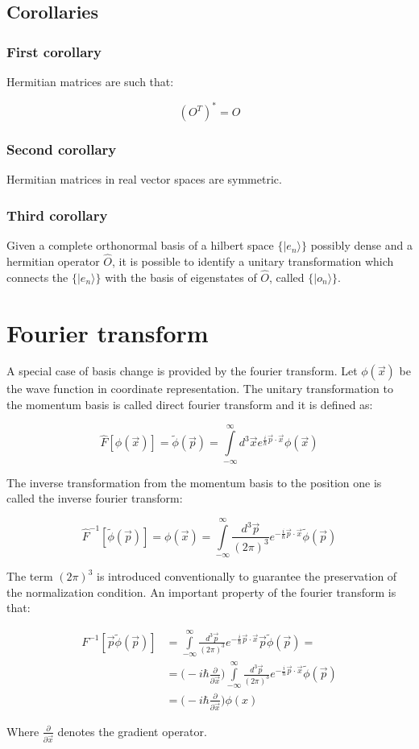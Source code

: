 	\subsection{Corollaries}

		\subsubsection{First corollary}
		Hermitian matrices are such that:

		$$(O^T)^* = O$$

		\subsubsection{Second corollary}
		Hermitian matrices in real vector spaces are symmetric.

		\subsubsection{Third corollary}
		Given a complete orthonormal basis of a hilbert space $\{|e_n\rangle\}$ possibly dense and a hermitian operator $\hat{O}$, it is possible to identify a unitary transformation which connects the $\{|e_n\rangle\}$ with the basis of eigenstates of $\hat{O}$, called $\{|o_n\rangle\}$.

\section{Fourier transform}
A special case of basis change is provided by the fourier transform.
Let $\phi(\vec{x})$ be the wave function in coordinate representation.
The unitary transformation to the momentum basis is called direct fourier transform and it is defined as:

$$\hat{F}[\phi(\vec{x})] = \tilde{\phi}(\vec{p}) = \int\limits_{-\infty}^\infty d^3\vec{x}e^{\frac{i}{\hbar}\vec{p}\cdot\vec{x}}\phi(\vec{x})$$

The inverse transformation from the momentum basis to the position one is called the inverse fourier transform:

$$\hat{F}^{-1}[\tilde{\phi}(\vec{p})] = \phi(\vec{x}) = \int\limits_{-\infty}^\infty \frac{d^3\vec{p}}{(2\pi)^3}e^{-\frac{i}{\hbar}\vec{p}\cdot\vec{x}}\tilde{\phi}(\vec{p})$$

The term $(2\pi)^3$ is introduced conventionally to guarantee the preservation of the normalization condition.
An important property of the fourier transform is that:

\begin{align*}
	F^{-1}[\vec{p}\tilde{\phi}(\vec{p})] &= \int\limits_{-\infty}^\infty \frac{d^3\vec{p}}{(2\pi)^3}e^{-\frac{i}{\hbar}\vec{p}\cdot\vec{x}}\vec{p}\tilde{\phi}(\vec{p})=\\
					     & = \biggl(-i\hbar\frac{\partial}{\partial \vec{x}}\biggr)\int\limits_{-\infty}^\infty \frac{d^3\vec{p}}{(2\pi)^3}e^{-\frac{i}{\hbar}\vec{p}\cdot\vec{x}}\tilde{\phi}(\vec{p})\\
					     & = \biggl(-i\hbar\frac{\partial}{\partial \vec{x}}\biggr)\phi(x)
\end{align*}

Where $\frac{\partial}{\partial\vec{x}}$ denotes the gradient operator.
